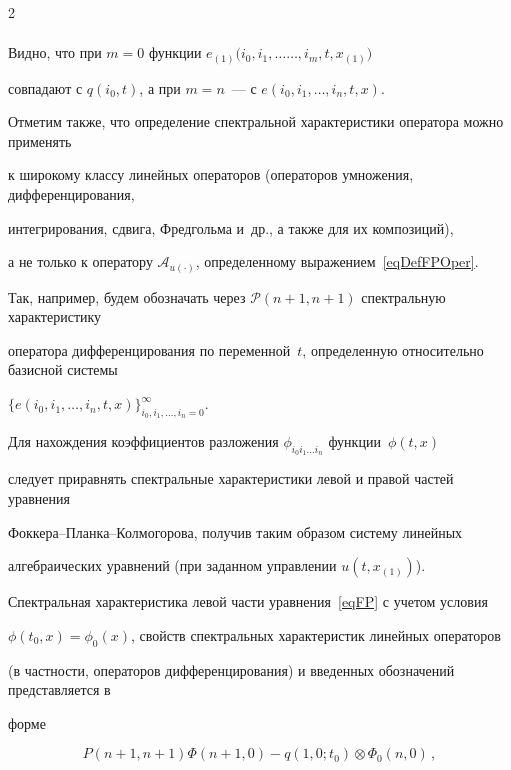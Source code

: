 \begin{multicols}{2}
\begin{multline}
\end{multline}





Видно, что при ${m = 0}$ функции $e_{(1)}(i_0,i_1,\dots$\linebreak $\dots,i_m,t,x_{(1)})$ 


совпадают с $q(i_0,t)$, а при ${m = n}$~--- с $e(i_0,i_1,\dots,i_n,t,x)$. 


Отметим также, что определение спектральной характеристики оператора можно применять 


к широкому классу линейных операторов (операторов умножения, дифференцирования, 


интегрирования, сдвига, Фредгольма и~др., а также для их композиций), 


а не только к оператору $\mathcal{A}_{u(\cdot)}$, определенному выражением~\eqref{eqDefFPOper}. 


Так, например, будем обозначать через ${\mathcal{P}(n+1,n+1)}$ спектральную характеристику 


оператора дифференцирования по переменной~$t$, определенную относительно базисной сис\-те\-мы 


${\{e(i_0,i_1,\dots,i_n,t,x)\}_{i_0,i_1,\dots,i_n = 0}^\infty}$.





Для нахождения коэффициентов разложения $\phi_{i_0 i_1 \dots i_n}$ функции~$\phi(t,x)$ 


следует приравнять спект\-раль\-ные характеристики левой и правой частей уравнения 


Фок\-ке\-ра--План\-ка--Кол\-мо\-го\-ро\-ва, получив таким образом систему линейных 


алгебраических уравнений (при заданном управлении ${u(t,x_{(1)})}$).





Спектральная характеристика левой части уравнения~\eqref{eqFP} с учетом условия 


${\phi(t_0,x) = \phi_0(x)}$, свойств спектральных характеристик линейных операторов 


(в част\-ности, операторов дифференцирования) и введенных обозначений представляется в 


форме 


$$


P(n+1,n+1) \Phi(n+1,0) - q(1,0;t_0) \otimes \Phi_0(n,0)\,,


$$



\end{multicols}
